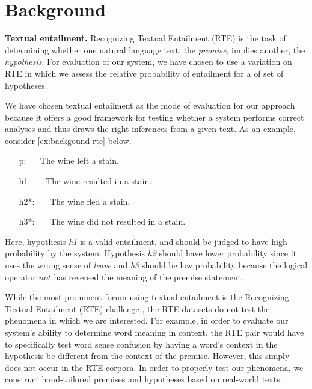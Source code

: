 \section{Background}

\textbf{Textual entailment.}
Recognizing Textual Entailment (RTE) is the task of determining whether one
natural language text, the {\it premise}, implies another, the {\it hypothesis}.
For evaluation of our system, we have chosen to use a variation on RTE in which
we assess the relative probability of entailment for a of set of hypotheses.

We have chosen textual entailment as the mode of evaluation
for our approach because it offers a good framework for testing whether a system
performs correct analyses and thus draws the right inferences from a given text.
As an example, consider \eqref{ex:backgound-rte} below.    
\begin{covex}\label{ex:backgound-rte}
\begin{itemize} \itemsep -3pt
  \item[p:]~~    The wine left a stain.
  \item[h1:]~~~The wine resulted in a stain.
  \item[h2*:]~~~The wine fled a stain.
  \item[h3*:]~~~The wine did not resulted in a stain.
\end{itemize}
\end{covex}
Here, hypothesis {\it h1} is a valid entailment, and should be judged to have
high probability by the system.  Hypothesis {\it h2} should have lower probability since
it uses the wrong sense of {\it leave} and {\it h3} should be low probability
because the logical operator $not$ has reversed the meaning of the premise
statement.

While the most prominent forum using textual entailment is the Recognizing
Textual Entailment (RTE) challenge \citep{dagan:rte2005}, the RTE datasets do
not test the phenomena in which we are interested. For example, in order to
evaluate our system's ability to determine word meaning in context, the RTE pair
would have to specifically test word sense confusion by having a word's context
in the hypothesis be different from the context of the premise.  However, this
simply does not occur in the RTE corpora.  In order to properly test our
phenomena, we construct hand-tailored premises and hypotheses based on
real-world texts.


